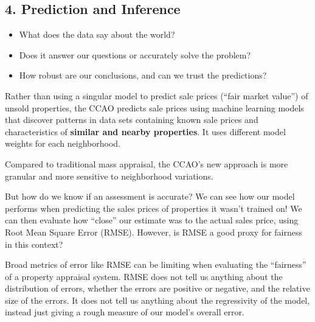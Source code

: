 \documentclass[
  letterpaper,
  DIV=11,
  numbers=noendperiod]{scrreprt}
\providecommand{\tightlist}{%
  \setlength{\itemsep}{0pt}\setlength{\parskip}{0pt}}\usepackage{longtable,booktabs,array}
\begin{document}
\subsection{4. Prediction and Inference}\label{prediction-and-inference}

\begin{tcolorbox}[enhanced jigsaw, coltitle=black, leftrule=.75mm, left=2mm, bottomrule=.15mm, bottomtitle=1mm, opacityback=0, breakable, arc=.35mm, opacitybacktitle=0.6, toptitle=1mm, title=\textcolor{quarto-callout-note-color}{\faInfo}\hspace{0.5em}{Driving Questions}, colbacktitle=quarto-callout-note-color!10!white, titlerule=0mm, rightrule=.15mm, colframe=quarto-callout-note-color-frame, toprule=.15mm, colback=white]

\begin{itemize}
\tightlist
\item
  What does the data say about the world?
\item
  Does it answer our questions or accurately solve the problem?
\item
  How robust are our conclusions, and can we trust the predictions?
\end{itemize}

\end{tcolorbox}

Rather than using a singular model to predict sale prices (``fair market
value'') of unsold properties, the CCAO predicts sale prices using
machine learning models that discover patterns in data sets containing
known sale prices and characteristics of \textbf{similar and nearby
properties}. It uses different model weights for each neighborhood.

Compared to traditional mass appraisal, the CCAO's new approach is more
granular and more sensitive to neighborhood variations.

But how do we know if an assessment is accurate? We can see how our
model performs when predicting the sales prices of properties it wasn't
trained on! We can then evaluate how ``close'' our estimate was to the
actual sales price, using Root Mean Square Error (RMSE). However, is
RMSE a good proxy for fairness in this context?

Broad metrics of error like RMSE can be limiting when evaluating the
``fairness'' of a property appraisal system. RMSE does not tell us
anything about the distribution of errors, whether the errors are
positive or negative, and the relative size of the errors. It does not
tell us anything about the regressivity of the model, instead just
giving a rough measure of our model's overall error.
\end{document}
